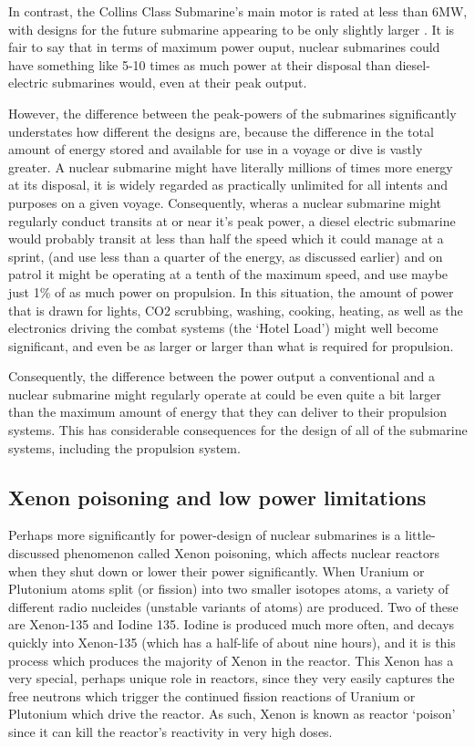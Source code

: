 \documentclass{article}\usepackage[]{graphicx}\usepackage[]{color}
\begin{document}
In contrast, the Collins Class Submarine's main motor is rated at less than 6MW, with designs for the future submarine appearing to be only slightly larger \parencite{patrick2012}.  It is fair to say that in terms of maximum power ouput, nuclear submarines could have something like 5-10 times as much power at their disposal than diesel-electric submarines would, even at their peak output.

However, the difference between the peak-powers of the submarines significantly understates how different the designs are, because the difference in the total amount of energy stored and available for use in a voyage or dive is vastly greater.  A nuclear submarine might have literally millions of times more energy at its disposal, it is widely regarded as practically unlimited for all intents and purposes on a given voyage. Consequently, wheras a nuclear submarine might regularly conduct transits at or near it's peak power, a diesel electric submarine would probably transit at less than half the speed which it could manage at a sprint, (and use less than a quarter of the energy, as discussed earlier) and on patrol it might be operating at a tenth of the maximum speed, and use maybe just 1\% of as much power on propulsion. In this situation, the amount of power that is drawn for lights, CO2 scrubbing, washing, cooking, heating, as well as the electronics driving the combat systems (the `Hotel Load') might well become significant, and even be as larger or larger than what is required for propulsion.

Consequently, the difference between the power output a conventional and a nuclear submarine might regularly operate at could be even quite a bit larger than the maximum amount of energy that they can deliver to their propulsion systems.  This has considerable consequences for the design of all of the submarine systems, including the propulsion system.

\subsection{Xenon poisoning and low power limitations}
Perhaps more significantly for power-design of nuclear submarines is a little-discussed phenomenon called Xenon poisoning, which affects nuclear reactors when they shut down or lower their power significantly. When Uranium or Plutonium atoms split (or fission) into two smaller isotopes atoms, a variety of different radio nucleides (unstable variants of atoms) are produced.  Two of these are Xenon-135 and Iodine 135.  Iodine is produced much more often, and decays quickly into Xenon-135 (which has a half-life of about nine hours), and it is this process which produces the majority of Xenon in the reactor.  This Xenon has a very special, perhaps unique role in reactors, since they very easily captures the free neutrons which trigger the continued fission reactions of Uranium or Plutonium which drive the reactor.  As such, Xenon is known as reactor `poison' since it can kill the reactor's reactivity in very high doses.
\end{document}
